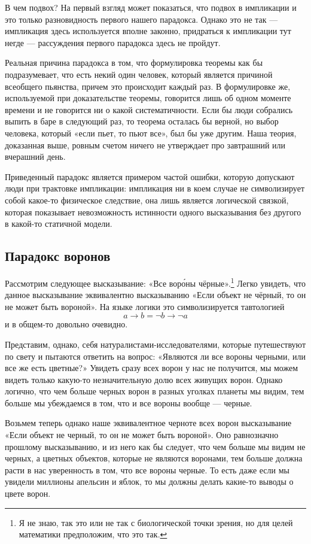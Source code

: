 В чем подвох? На первый взгляд может показаться, что подвох в импликации и это только разновидность первого нашего парадокса. Однако это не так — импликация здесь используется вполне законно, придраться к импликации тут негде — рассуждения первого парадокса здесь не пройдут.

Реальная причина парадокса в том, что формулировка теоремы как бы подразумевает, что есть некий один человек, который является причиной всеобщего пьянства, причем это происходит каждый раз. В формулировке же, используемой при доказательстве теоремы, говорится лишь об одном моменте времени и не говорится ни о какой систематичности. Если бы люди собрались выпить в баре в следующий раз, то теорема осталась бы верной, но выбор человека, который «если пьет, то пьют все», был бы уже другим. Наша теория, доказанная выше, ровным счетом ничего не утверждает про завтрашний или вчерашний день.

Приведенный парадокс является примером частой ошибки, которую допускают люди при трактовке импликации: импликация ни в коем случае не символизирует собой  какое-то физическое следствие, она лишь является логической связкой, которая показывает невозможность истинности одного высказывания без другого в какой-то статичной модели.

\subsection{Парадокс воронов}

Рассмотрим следующее высказывание: «Все вор\'{о}ны чёрные».\footnote{Я не знаю, так это или не так с биологической точки зрения, но для целей математики предположим, что это так.} Легко увидеть, что данное высказывание эквивалентно высказыванию «Если объект не чёрный, то он не может быть вороной». На языке логики это символизируется тавтологией $$a \rightarrow b = \neg b \rightarrow \neg a$$ и в общем-то довольно очевидно.

Представим, однако, себя натуралистами-исследователями, которые путешествуют по свету и пытаются ответить на вопрос: «Являются ли все вороны черными, или все же есть цветные?» Увидеть сразу всех ворон у нас не получится, мы можем видеть только какую-то незначительную долю всех живущих ворон. Однако логично, что чем больше черных ворон в разных уголках планеты мы видим, тем больше мы убеждаемся в том, что и все вороны вообще — черные.

Возьмем теперь однако наше эквивалентное черноте всех ворон высказывание «Если объект не черный, то он не может быть вороной». Оно равнозначно прошлому высказыванию, и из него как бы следует, что чем больше мы видим не черных, а цветных объектов, которые не являются воронами, тем больше должна расти в нас уверенность в том, что все вороны черные. То есть даже если мы увидели миллионы апельсин и яблок, то мы должны делать какие-то выводы о цвете ворон.

